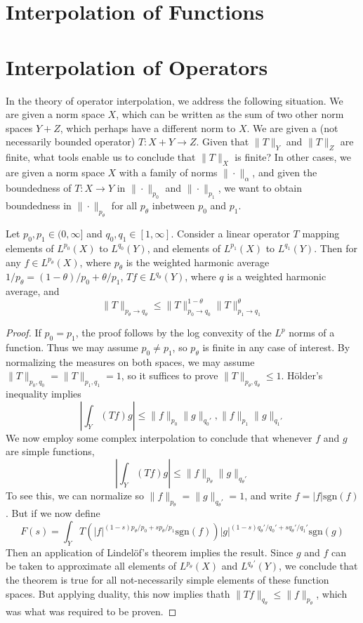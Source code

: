 \section{Interpolation of Functions}



\section{Interpolation of Operators}

In the theory of operator interpolation, we address the following situation. We are given a norm space $X$, which can be written as the sum of two other norm spaces $Y + Z$, which perhaps have a different norm to $X$. We are given a (not necessarily bounded operator) $T: X + Y \to Z$. Given that $\| T \|_Y$ and $\| T \|_Z$ are finite, what tools enable us to conclude that $\| T \|_X$ is finite? In other cases, we are given a norm space $X$ with a family of norms $\| \cdot \|_\alpha$, and given the boundedness of $T: X \to Y$ in $\| \cdot \|_{p_0}$ and $\| \cdot \|_{p_1}$, we want to obtain boundedness in $\| \cdot \|_{p_\theta}$ for all $p_\theta$ inbetween $p_0$ and $p_1$.

\begin{theorem}
	Let $p_0,p_1 \in (0,\infty]$ and $q_0,q_1 \in [1,\infty]$. Consider a linear operator $T$ mapping elements of $L^{p_0}(X)$ to $L^{q_0}(Y)$, and elements of $L^{p_1}(X)$ to $L^{q_1}(Y)$. Then for any $f \in L^{p_\theta}(X)$, where $p_\theta$ is the weighted harmonic average $1/p_\theta = (1 - \theta)/p_0 + \theta/p_1$, $Tf \in L^{q_\theta}(Y)$, where $q$ is a weighted harmonic average, and
	\[ \| T \|_{p_\theta \to q_\theta} \leq \| T \|_{p_0 \to q_0}^{1-\theta} \| T \|_{p_1 \to q_1}^\theta \]
\end{theorem}
\begin{proof}
	If $p_0 = p_1$, the proof follows by the log convexity of the $L^p$ norms of a function. Thus we may assume $p_0 \neq p_1$, so $p_\theta$ is finite in any case of interest. By normalizing the measures on both spaces, we may assume $\| T \|_{p_0,q_0} = \| T \|_{p_1,q_1} = 1$, so it suffices to prove $\| T \|_{p_\theta,q_\theta} \leq 1$. H\"{o}lder's inequality implies
	\[ \left| \int_Y (Tf) g \right| \leq \| f \|_{p_0} \| g \|_{q_0'}, \| f \|_{p_1} \| g \|_{q_1'} \]
	We now employ some complex interpolation to conclude that whenever $f$ and $g$ are simple functions,
	\[ \left| \int_Y (Tf) g \right| \leq \| f \|_{p_\theta} \| g \|_{q_\theta'} \]
	To see this, we can normalize so $\| f \|_{p_\theta} = \| g \|_{q_\theta'} = 1$, and write $f = |f| \text{sgn}(f)$. But if we now define
	\[ F(s) = \int_Y T(|f|^{(1-s)p_\theta/p_0 + sp_\theta/p_1} \text{sgn}(f)) |g|^{(1-s)q_\theta'/q_0' + sq_\theta'/q_1'} \text{sgn}(g) \]
	Then an application of Lindel\"{o}f's theorem implies the result. Since $g$ and $f$ can be taken to approximate all elements of $L^{p_\theta}(X)$ and $L^{q_\theta'}(Y)$, we conclude that the theorem is true for all not-necessarily simple elements of these function spaces. But applying duality, this now implies thath $\| Tf \|_{q_\theta} \leq \| f \|_{p_\theta}$, which was what was required to be proven.
\end{proof}

